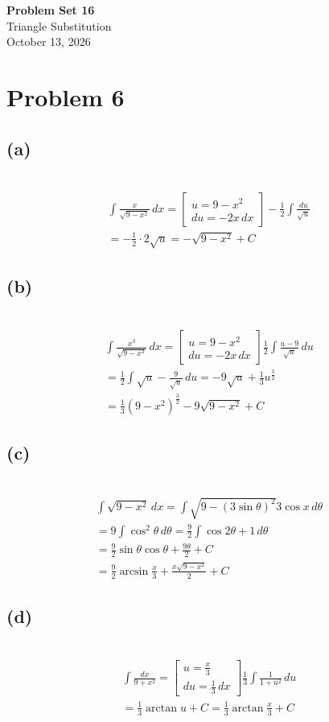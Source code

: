 \documentclass[12pt]{article}
\newcommand{\problem}[1]{\section{Problem #1}}
\newcommand{\subproblem}[1]{\subsection{(#1)} \,}
\begin{document}
\vspace*{0cm}

\begin{center}
    {\Large \bfseries Problem Set 16} \\[0.5cm]
    {\large Triangle Substitution} \\[0.35cm]
    {\normalsize October 13, 2026}
\end{center}


\problem{6}

\subproblem{a}
\begin{gather*}
    \int \frac{x}{\sqrt{9-x^2}} \, dx =
    \begin{bmatrix}
        u=9-x^2\\
        du= -2x\, dx
    \end{bmatrix} -\frac{1}{2}\int \frac{du}{\sqrt{u}} \\
    = -\frac{1}{2}\cdot2\sqrt{u} = \boxed{-\sqrt{9-x^2}+C}
\end{gather*}

\subproblem{b}
\begin{gather*}
    \int \frac{x^3}{\sqrt{9-x^2}} \, dx  =
    \begin{bmatrix}
        u=9-x^2\\
        du= -2x\, dx
    \end{bmatrix} \frac{1}{2}\int \frac{u-9}{\sqrt{u}} \, du \\
    =\frac{1}{2} \int \sqrt u - \frac{9}{\sqrt{u}} \, du = -9\sqrt{u} + \frac{1}{3}u^\frac{3}{2} \\
    = \boxed{\frac{1}{3}(9-x^2)^\frac{3}{2} - 9\sqrt{9-x^2} +C}
\end{gather*}

\subproblem{c}
\begin{gather*}
    \int \sqrt{9-x^2} \, dx = \int \sqrt{9-(3\sin \theta )^2} 3\cos x\, d\theta \\
    = 9 \int \cos ^2 \theta \, d\theta  = \frac{9}{2} \int \cos 2 \theta +1 \, d \theta \\
    = \frac{9}{2} \sin \theta \cos \theta  +\frac{9\theta}{2} +C\\
    = \boxed{\frac{9}{2}\arcsin \frac{x}{3} + \frac{x\sqrt{9-x^2}}{2}+C}
\end{gather*}

\subproblem{d}
\begin{gather*}
    \int \frac{dx}{9+x^2} =
    \begin{bmatrix}
        u=\frac{x}{3}\\
        du=\frac{1}{3}\, dx
    \end{bmatrix} \frac{1}{3} \int \frac{1}{1+u^2} \,du \\
    =\frac{1}{3} \arctan u + C= \boxed{\frac{1}{3}\arctan \frac{x}{3}+C}
\end{gather*}
\end{document}
